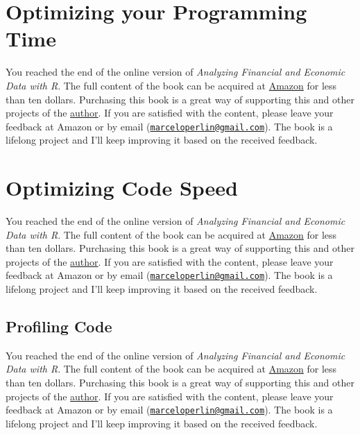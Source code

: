 \documentclass[
  12pt,
]{book}
\newenvironment{pleasebuyit}
{\begin{noteblock}
		
	} {\end{noteblock}}
\begin{document}
\hypertarget{optimizing-your-programming-time}{%
\section{Optimizing your Programming Time}\label{optimizing-your-programming-time}}

\begin{pleasebuyit}
You reached the end of the online version of \emph{Analyzing Financial
and Economic Data with R}. The full content of the book can be acquired
at \href{https://www.amazon.com/dp/B084LSNXMN}{Amazon} for less than ten
dollars. Purchasing this book is a great way of supporting this and
other projects of the \href{https://www.msperlin.com/blog/}{author}. If
you are satisfied with the content, please leave your feedback at Amazon
or by email
(\href{mailto:marceloperlin@gmail.com}{\nolinkurl{marceloperlin@gmail.com}}).
The book is a lifelong project and I'll keep improving it based on the
received feedback.
\end{pleasebuyit}

\hypertarget{optimizing-code-speed}{%
\section{Optimizing Code Speed}\label{optimizing-code-speed}}

\begin{pleasebuyit}
You reached the end of the online version of \emph{Analyzing Financial
and Economic Data with R}. The full content of the book can be acquired
at \href{https://www.amazon.com/dp/B084LSNXMN}{Amazon} for less than ten
dollars. Purchasing this book is a great way of supporting this and
other projects of the \href{https://www.msperlin.com/blog/}{author}. If
you are satisfied with the content, please leave your feedback at Amazon
or by email
(\href{mailto:marceloperlin@gmail.com}{\nolinkurl{marceloperlin@gmail.com}}).
The book is a lifelong project and I'll keep improving it based on the
received feedback.
\end{pleasebuyit}

\hypertarget{profiling-code}{%
\subsection{Profiling Code}\label{profiling-code}}

\begin{pleasebuyit}
You reached the end of the online version of \emph{Analyzing Financial
and Economic Data with R}. The full content of the book can be acquired
at \href{https://www.amazon.com/dp/B084LSNXMN}{Amazon} for less than ten
dollars. Purchasing this book is a great way of supporting this and
other projects of the \href{https://www.msperlin.com/blog/}{author}. If
you are satisfied with the content, please leave your feedback at Amazon
or by email
(\href{mailto:marceloperlin@gmail.com}{\nolinkurl{marceloperlin@gmail.com}}).
The book is a lifelong project and I'll keep improving it based on the
received feedback.
\end{pleasebuyit}
\end{document}
